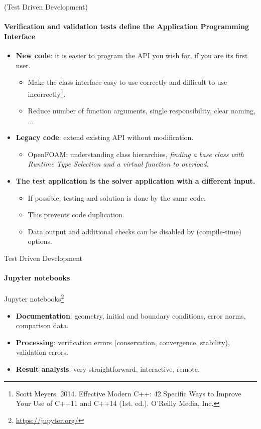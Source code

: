 \documentclass[
	aspectratio=169,%
	color={accentcolor=2d},
	logo=true,%
	colorframetitle=true,%
	]{tudabeamer}
\begin{document}
\begin{frame}{(Test Driven Development)} 
    \framesubtitle{Verification and validation tests define the Application Programming Interface}
        \vfill

    \begin{itemize}
        \item \textbf{New code}: it is easier to program the API you wish for, if you are its first user. 
            \begin{itemize}
                \item Make the class interface easy to use correctly and difficult to use incorrectly\footnote{Scott Meyers. 2014. Effective Modern C++: 42 Specific Ways to Improve Your Use of C++11 and C++14 (1st. ed.). O'Reilly Media, Inc.}.
                \item Reduce number of function arguments, single responsibility, clear naming, ... 
            \end{itemize}
        \item \textbf{Legacy code}: extend existing API without modification. 
            \begin{itemize}
                \item OpenFOAM: understanding class hierarchies, \textit{finding a base class with Runtime Type Selection and a virtual function to overload.}
            \end{itemize}
        \item \textbf{The test application is the solver application with a different input.}
            \begin{itemize}
                \item If possible, testing and solution is done by the same code.  
                \item This prevents code duplication. 
                \item Data output and additional checks can be disabled by (compile-time) options.
            \end{itemize}
    \end{itemize}

\end{frame}


\begin{frame}{Test Driven Development} 
    \framesubtitle{Jupyter notebooks}

    \vfill
    Jupyter notebooks\footnote{\href{https://jupyter.org/}{https://jupyter.org/}}
    \begin{itemize}
        \item \textbf{Documentation}: geometry, initial and boundary conditions, error norms, comparison data.
        \item \textbf{Processing}: verification errors (conservation, convergence, stability), validation errors. 
        \item \textbf{Result analysis}: very straightforward, interactive, remote.
    \end{itemize}
\end{frame}
\end{document}
